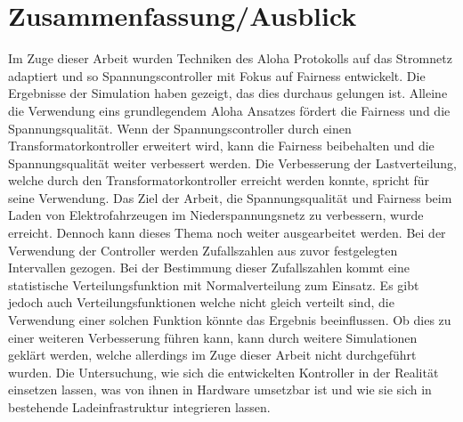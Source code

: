 \chapter{Zusammenfassung/Ausblick}
Im Zuge dieser Arbeit wurden Techniken des Aloha Protokolls auf das Stromnetz adaptiert und so Spannungscontroller mit Fokus auf Fairness entwickelt. Die Ergebnisse der Simulation haben gezeigt, das dies durchaus gelungen ist. Alleine die Verwendung eins grundlegendem Aloha Ansatzes fördert die Fairness und die Spannungsqualität. Wenn der Spannungscontroller durch einen Transformatorkontroller erweitert wird, kann die Fairness beibehalten und die Spannungsqualität weiter verbessert werden. Die Verbesserung der Lastverteilung, welche durch den Transformatorkontroller erreicht werden konnte, spricht für seine Verwendung. Das Ziel der Arbeit, die Spannungsqualität und Fairness beim Laden von Elektrofahrzeugen im Niederspannungsnetz zu verbessern, wurde erreicht. Dennoch kann dieses Thema noch weiter ausgearbeitet werden. Bei der Verwendung der Controller werden Zufallszahlen aus zuvor festgelegten Intervallen gezogen. Bei der Bestimmung dieser Zufallszahlen kommt eine statistische Verteilungsfunktion mit Normalverteilung zum Einsatz. Es gibt jedoch auch Verteilungsfunktionen welche nicht gleich verteilt sind, die Verwendung einer solchen Funktion könnte das Ergebnis beeinflussen. Ob dies zu einer weiteren Verbesserung führen kann, kann durch weitere Simulationen geklärt werden, welche allerdings im Zuge dieser Arbeit nicht durchgeführt wurden. Die Untersuchung, wie sich die entwickelten Kontroller in der Realität einsetzen lassen, was von ihnen in Hardware umsetzbar ist und wie sie sich in bestehende Ladeinfrastruktur integrieren lassen.

